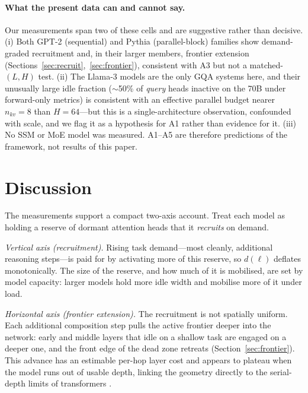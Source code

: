 \documentclass[11pt]{article}
\newcommand{\dl}{d(\ell)}
\begin{document}
\paragraph{What the present data can and cannot say.}
Our measurements span two of these cells and are suggestive rather than
decisive. (i) Both GPT-2 (sequential) and Pythia (parallel-block) families show
demand-graded recruitment and, in their larger members, frontier extension
(Sections~\ref{sec:recruit},~\ref{sec:frontier}), consistent with A3 but not a
matched-$(L,H)$ test. (ii) The Llama-3 models are the only GQA systems here,
and their unusually large idle fraction ($\sim$50\% of \emph{query} heads
inactive on the 70B under forward-only metrics) is consistent with an effective
parallel budget nearer $n_{kv}{=}8$ than $H{=}64$---but this is a
single-architecture observation, confounded with scale, and we flag it as a
hypothesis for A1 rather than evidence for it. (iii) No SSM or MoE model was
measured. A1--A5 are therefore predictions of the framework, not results of
this paper.

\section{Discussion}\label{sec:discussion}
The measurements support a compact two-axis account. Treat each model as
holding a reserve of dormant attention heads that it \emph{recruits} on
demand.

\emph{Vertical axis (recruitment).} Rising task demand---most cleanly,
additional reasoning steps---is paid for by activating more of this reserve,
so $\dl$ deflates monotonically. The size of the reserve, and how much of it
is mobilised, are set by model capacity: larger models hold more idle width
and mobilise more of it under load.

\emph{Horizontal axis (frontier extension).} The recruitment is not
spatially uniform. Each additional composition step pulls the active frontier
deeper into the network: early and middle layers that idle on a shallow task
are engaged on a deeper one, and the front edge of the dead zone retreats
(Section~\ref{sec:frontier}). This advance has an estimable per-hop layer
cost and appears to plateau when the model runs out of usable depth, linking
the geometry directly to the serial-depth limits of transformers
\citep{merrill2023parallelism,yang2024large,biran2024hopping}.
\end{document}
